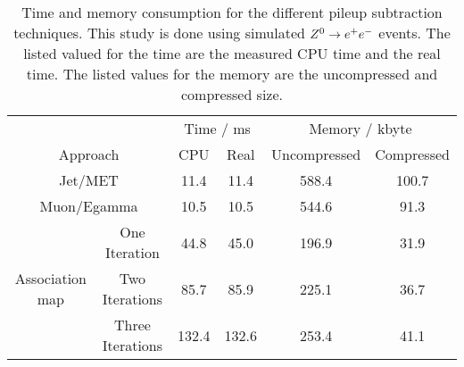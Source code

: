 
\begin{table}[h]
\begin{center}
\caption{Time and memory consumption for the different pileup subtraction techniques. This study is done using simulated ${Z^{0}}\rightarrow e^+e^-$ events. The listed valued for the time are the measured CPU time and the real time. The listed values for the memory are the uncompressed and compressed size.}
\label{tab:OSPTimMemZEE}

\begin{tabular}{c c c c c c}
 & & \multicolumn{2}{c}{Time / ms} & \multicolumn{2}{c}{Memory / kbyte}  \\
\multicolumn{2}{c}{Approach} & CPU & Real & Uncompressed & Compressed \\
\midrule[2pt]
\multicolumn{2}{c}{Jet/MET}  & 11.4 & 11.4 & 588.4 & 100.7 \\
\midrule
\multicolumn{2}{c}{Muon/Egamma}  & 10.5 & 10.5 & 544.6 & 91.3 \\
\midrule
\multirow{3}{*}{Association map} 
                        & One Iteration & 44.8 & 45.0 & 196.9 & 31.9 \\
\cmidrule{2-6}
                        & Two Iterations & 85.7 & 85.9 & 225.1 & 36.7 \\
\cmidrule{2-6}
                        & Three Iterations  & 132.4 & 132.6 & 253.4 & 41.1 \\

\end{tabular}

\end{center}
\end{table}